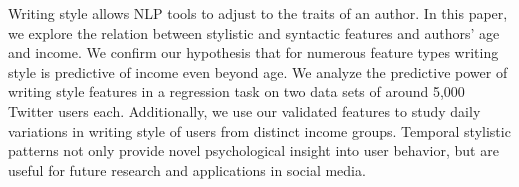 Writing style allows NLP tools to adjust to the traits of an author. In this paper, we explore the relation between stylistic and syntactic features and authors' age and income. We confirm our hypothesis that for numerous feature types writing style is predictive of income even beyond age. We analyze the predictive power of writing style features in a regression task on two data sets of around 5,000 Twitter users each. Additionally, we use our validated features to study daily variations in writing style of users from distinct income groups. Temporal stylistic patterns not only provide novel psychological insight into user behavior, but are useful for future research and applications in social media.
